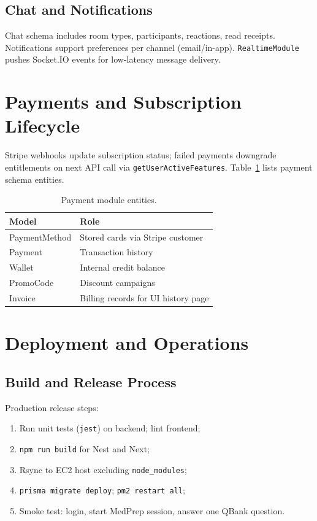 \subsection{Chat and Notifications}
Chat schema includes room types, participants, reactions, read receipts. Notifications support preferences per channel (email/in-app). \texttt{RealtimeModule} pushes Socket.IO events for low-latency message delivery.

\section{Payments and Subscription Lifecycle}
Stripe webhooks update subscription status; failed payments downgrade entitlements on next API call via \texttt{getUserActiveFeatures}. Table~\ref{tab:payment-entities} lists payment schema entities.

\begin{table}[htbp]
  \centering
  \caption{Payment module entities.}
  \label{tab:payment-entities}
  \small
  \begin{tabular}{@{}lp{9.2cm}@{}}
    \toprule
    \textbf{Model} & \textbf{Role} \\
    \midrule
    PaymentMethod & Stored cards via Stripe customer \\
    Payment & Transaction history \\
    Wallet & Internal credit balance \\
    PromoCode & Discount campaigns \\
    Invoice & Billing records for UI history page \\
    \bottomrule
  \end{tabular}
\end{table}

\section{Deployment and Operations}


\subsection{Build and Release Process}
Production release steps:
\begin{enumerate}
  \item Run unit tests (\texttt{jest}) on backend; lint frontend;
  \item \texttt{npm run build} for Nest and Next;
  \item Rsync to EC2 host excluding \texttt{node\_modules};
  \item \texttt{prisma migrate deploy}; \texttt{pm2 restart all};
  \item Smoke test: login, start MedPrep session, answer one QBank question.
\end{enumerate}

